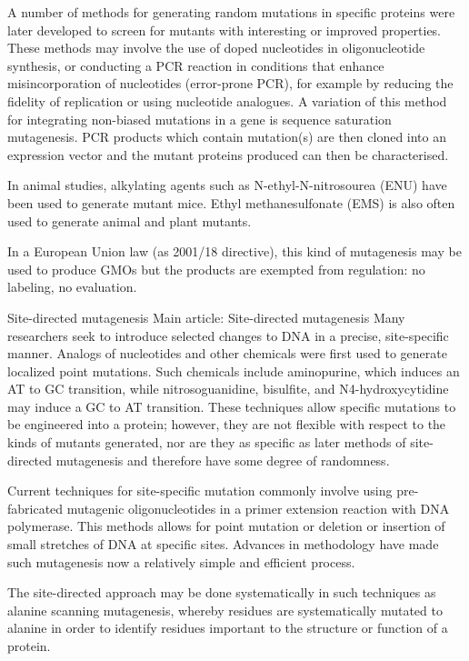 A number of methods for generating random mutations in specific proteins were later developed to screen for mutants with interesting or improved properties. These methods may involve the use of doped nucleotides in oligonucleotide synthesis, or conducting a PCR reaction in conditions that enhance misincorporation of nucleotides (error-prone PCR), for example by reducing the fidelity of replication or using nucleotide analogues. A variation of this method for integrating non-biased mutations in a gene is sequence saturation mutagenesis. PCR products which contain mutation(s) are then cloned into an expression vector and the mutant proteins produced can then be characterised.

In animal studies, alkylating agents such as N-ethyl-N-nitrosourea (ENU) have been used to generate mutant mice. Ethyl methanesulfonate (EMS) is also often used to generate animal and plant mutants.

In a European Union law (as 2001/18 directive), this kind of mutagenesis may be used to produce GMOs but the products are exempted from regulation: no labeling, no evaluation.

Site-directed mutagenesis
Main article: Site-directed mutagenesis
Many researchers seek to introduce selected changes to DNA in a precise, site-specific manner. Analogs of nucleotides and other chemicals were first used to generate localized point mutations. Such chemicals include aminopurine, which induces an AT to GC transition, while nitrosoguanidine, bisulfite, and N4-hydroxycytidine may induce a GC to AT transition. These techniques allow specific mutations to be engineered into a protein; however, they are not flexible with respect to the kinds of mutants generated, nor are they as specific as later methods of site-directed mutagenesis and therefore have some degree of randomness.

Current techniques for site-specific mutation commonly involve using pre-fabricated mutagenic oligonucleotides in a primer extension reaction with DNA polymerase. This methods allows for point mutation or deletion or insertion of small stretches of DNA at specific sites. Advances in methodology have made such mutagenesis now a relatively simple and efficient process.

The site-directed approach may be done systematically in such techniques as alanine scanning mutagenesis, whereby residues are systematically mutated to alanine in order to identify residues important to the structure or function of a protein.

